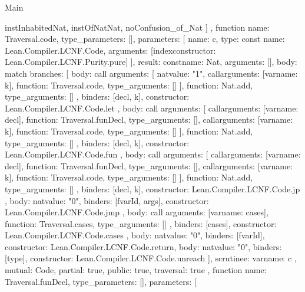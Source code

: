 \begin{lexlean}{Main}
\begin{toolingmodule}
{{        instInhabitedNat,
        instOfNatNat,
        noConfusion_of_Nat
      ]
    },
    function{
      name: Traversal.code,
      type_parameters: [],
      parameters: [
        {
          name: c,
          type: const{
            name: Lean.Compiler.LCNF.Code,
            arguments: [index{constructor: Lean.Compiler.LCNF.Purity.pure}]
          }
        }
      ],
      result: const{name: Nat, arguments: []},
      body: match{
        branches: [
          {
            body: call{
              arguments: [
                nat{value: "1"},
                call{arguments: [var{name: k}], function: Traversal.code, type_arguments: []}
              ],
              function: Nat.add,
              type_arguments: []
            },
            binders: [decl, k],
            constructor: Lean.Compiler.LCNF.Code.let
          },
          {
            body: call{
              arguments: [
                call{arguments: [var{name: decl}], function: Traversal.funDecl, type_arguments: []},
                call{arguments: [var{name: k}], function: Traversal.code, type_arguments: []}
              ],
              function: Nat.add,
              type_arguments: []
            },
            binders: [decl, k],
            constructor: Lean.Compiler.LCNF.Code.fun
          },
          {
            body: call{
              arguments: [
                call{arguments: [var{name: decl}], function: Traversal.funDecl, type_arguments: []},
                call{arguments: [var{name: k}], function: Traversal.code, type_arguments: []}
              ],
              function: Nat.add,
              type_arguments: []
            },
            binders: [decl, k],
            constructor: Lean.Compiler.LCNF.Code.jp
          },
          {
            body: nat{value: "0"},
            binders: [fvarId, args],
            constructor: Lean.Compiler.LCNF.Code.jmp
          },
          {
            body: call{
              arguments: [var{name: cases}],
              function: Traversal.cases,
              type_arguments: []
            },
            binders: [cases],
            constructor: Lean.Compiler.LCNF.Code.cases
          },
          {body: nat{value: "0"}, binders: [fvarId], constructor: Lean.Compiler.LCNF.Code.return},
          {body: nat{value: "0"}, binders: [type], constructor: Lean.Compiler.LCNF.Code.unreach}
        ],
        scrutinee: var{name: c}
      },
      mutual: Code,
      partial: true,
      public: true,
      traversal: true
    },
    function{
      name: Traversal.funDecl,
      type_parameters: [],
      parameters: [
}}
\end{toolingmodule}
\end{lexlean}
